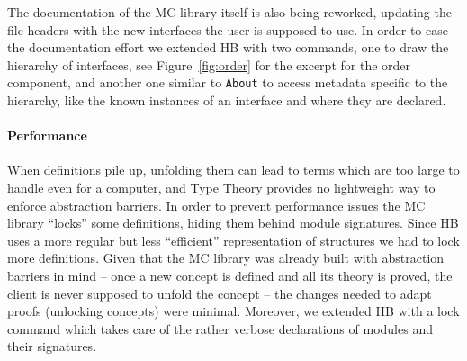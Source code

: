\documentclass{easychair}
\def\MC{{\sf MC}}
\def\HB{{\sf HB}}
\begin{document}
The documentation of the \MC{} library itself is also being reworked, updating
the file headers with the new interfaces the user is supposed to use.
In order to ease the documentation effort we extended \HB{} with two commands,
one to draw the hierarchy of interfaces, see Figure~\ref{fig:order} for the excerpt
for the order component, and another one similar to \verb+About+ to access
metadata specific to the hierarchy, like the known instances of an interface
and where they are declared.
%
%
\paragraph{Performance}

When definitions pile up, unfolding
them can lead to terms which are too large to handle even for a computer,
and Type Theory provides no lightweight way to enforce abstraction barriers.
In order to prevent performance issues the \MC{} library ``locks''
some definitions, hiding them behind module signatures.
Since \HB{} uses a more regular but less ``efficient'' representation of
structures we had to lock more definitions.
Given that the \MC{} library was already built with abstraction barriers
in mind --
once a new concept is defined and all its theory is proved, the client
is never supposed to unfold the concept -- the changes needed to adapt
proofs (unlocking concepts) were minimal. Moreover, we extended \HB{} with
a lock command which takes care of the rather verbose declarations of modules
and their signatures.
\end{document}
